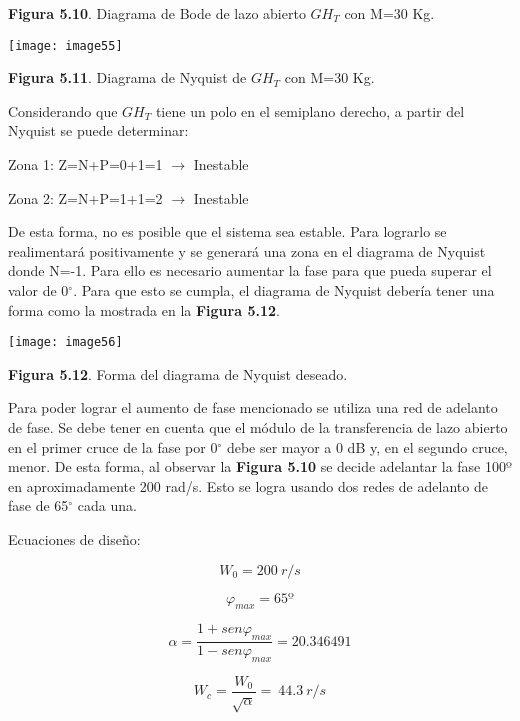 \documentclass{article} %
\begin{document}
\noindent \textbf{Figura 5.10}. Diagrama de Bode de lazo abierto ${GH}_T$ con M=30 Kg.

\noindent \texttt{[image: image55]}

\noindent \textbf{Figura 5.11}. Diagrama de Nyquist de ${GH}_T$ con M=30 Kg.

\noindent 

\noindent Considerando que ${GH}_T$ tiene un polo en el semiplano derecho, a partir del Nyquist se puede determinar:

\noindent 

\noindent Zona 1: Z=N+P=0+1=1 $\mathrm{\to}$ Inestable 

\noindent 

\noindent Zona 2: Z=N+P=1+1=2 $\mathrm{\to}$ Inestable

\noindent 

\noindent De esta forma, no es posible que el sistema sea estable. Para lograrlo se realimentar\'{a} positivamente y se generar\'{a} una zona en el diagrama de Nyquist donde N=-1. Para ello es necesario aumentar la fase para que pueda superar el valor de 0$\mathrm{{}^\circ}$.  Para que esto se cumpla, el diagrama de Nyquist deber\'{i}a tener una forma como la  mostrada en la \textbf{Figura 5.12}.

\noindent 

\noindent \texttt{[image: image56]}

\noindent \textbf{Figura 5.12}. Forma del diagrama de Nyquist deseado.

\noindent 

\noindent Para poder lograr el aumento de fase mencionado se utiliza una red de adelanto de fase. Se debe tener en cuenta que el m\'{o}dulo de la transferencia de lazo abierto en el primer cruce de la fase por 0$\mathrm{{}^\circ}$ debe ser mayor a 0 dB y, en el segundo cruce, menor. De esta forma, al observar la \textbf{Figura 5.10} se decide adelantar la fase 100º en aproximadamente 200 rad/s. Esto se logra usando dos redes de adelanto de fase de 65$\mathrm{{}^\circ}$ cada una.

\noindent 

\noindent Ecuaciones de dise\~{n}o:

\noindent 
\[W_0=200\ r/s\] 

\[{\varphi }_{max}=65\textrm{º}\] 

\[\alpha =\frac{1+sen{\varphi }_{max}}{1-sen{\varphi }_{max}}=20.346491\] 

\[W_c=\frac{W_0}{\sqrt{\alpha }}=\ 44.3\ r/s\] 
\end{document}
